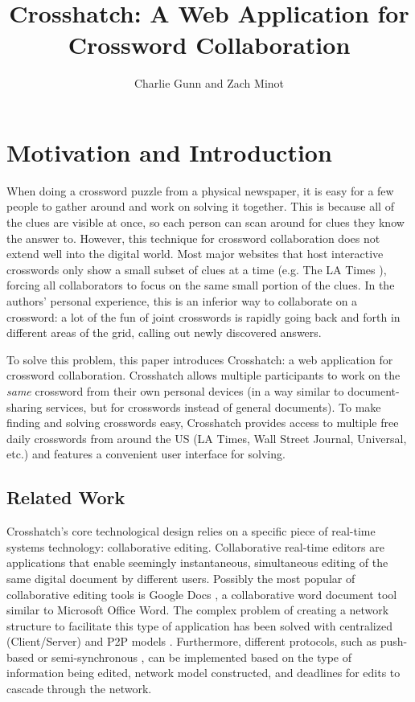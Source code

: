 \documentclass{article}
\author{Charlie Gunn and Zach Minot}
\title{Crosshatch: A Web Application for Crossword Collaboration}
\begin{document}
\maketitle

\section{Motivation and Introduction}
\label{mot}
When doing a crossword puzzle from a physical newspaper, it is easy for a few people to gather around and work on solving it together.
This is because all of the clues are visible at once, so each person can scan around for clues they know the answer to. However, this technique
for crossword collaboration does not extend well into the digital world. Most major websites that host interactive crosswords only show a small subset of
clues at a time (e.g. The LA Times \cite{latcrossword}), forcing all collaborators to focus on the same small portion of the clues. In the authors' personal experience,
this is an inferior way to collaborate on a crossword: a lot of the fun of joint crosswords is rapidly going back and forth in different areas
of the grid, calling out newly discovered answers.

To solve this problem, this paper introduces Crosshatch: a web application for crossword collaboration. Crosshatch
allows multiple participants to work on the \textit{same} crossword from their own personal devices (in a way similar to document-sharing services,
but for crosswords instead of general documents). To make finding and solving crosswords easy, Crosshatch provides access to multiple free daily crosswords
from around the US (LA Times, Wall Street Journal, Universal, etc.) and features a convenient user interface for solving.

\newpage
\subsection{Related Work}
\label{relatedwork}
Crosshatch's core technological design relies on a specific piece of real-time systems technology: collaborative editing.
Collaborative real-time editors are applications that enable seemingly instantaneous, simultaneous editing
of the same digital document by different users.
Possibly the most popular of collaborative editing tools is Google Docs \cite{googledocs}, a collaborative
word document tool similar to Microsoft Office Word.
The complex problem of creating a network structure to facilitate this type of application has been solved with centralized (Client/Server)
and P2P models \cite{p2p} \cite{p2p2}.
Furthermore, different protocols, such as push-based \cite{pushbased} or semi-synchronous \cite{semisynchronous}, can be implemented based on the type of information being edited,
network model constructed, and deadlines for edits to cascade through the network.
\end{document}
